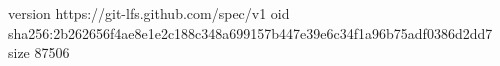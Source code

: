 version https://git-lfs.github.com/spec/v1
oid sha256:2b262656f4ae8e1e2c188c348a699157b447e39e6c34f1a96b75adf0386d2dd7
size 87506
